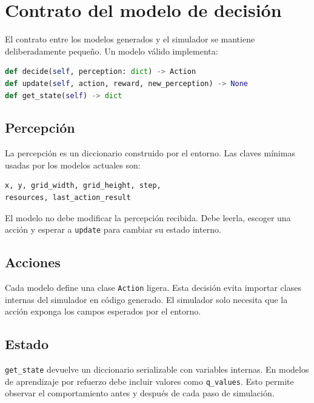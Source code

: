 \chapter{Contrato del modelo de decisión}

El contrato entre los modelos generados y el simulador se mantiene
deliberadamente pequeño. Un modelo válido implementa:

\begin{lstlisting}[language=Python]
def decide(self, perception: dict) -> Action
def update(self, action, reward, new_perception) -> None
def get_state(self) -> dict
\end{lstlisting}

\section{Percepción}

La percepción es un diccionario construido por el entorno. Las claves mínimas
usadas por los modelos actuales son:

\begin{verbatim}
x, y, grid_width, grid_height, step,
resources, last_action_result
\end{verbatim}

El modelo no debe modificar la percepción recibida. Debe leerla, escoger una
acción y esperar a \texttt{update} para cambiar su estado interno.

\section{Acciones}

Cada modelo define una clase \texttt{Action} ligera. Esta decisión evita importar
clases internas del simulador en código generado. El simulador solo necesita que
la acción exponga los campos esperados por el entorno.

\section{Estado}

\texttt{get\_state} devuelve un diccionario serializable con variables internas.
En modelos de aprendizaje por refuerzo debe incluir valores como
\texttt{q\_values}. Esto permite observar el comportamiento antes y después de
cada paso de simulación.
